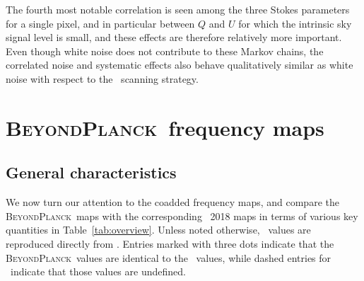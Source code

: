 \documentclass[twocolumn]{aa}
\newcommand{\BP}{\textsc{BeyondPlanck}}
\begin{document}
The fourth most notable correlation is seen among the three Stokes
parameters for a single pixel, and in particular between $Q$ and $U$
for which the intrinsic sky signal level is small, and these effects
are therefore relatively more important. Even though white noise does
not contribute to these Markov chains, the correlated noise and
systematic effects also behave qualitatively similar as white noise
with respect to the \Planck\ scanning strategy. 




\section{\BP\ frequency maps}
\label{sec:freqmaps}

\subsection{General characteristics}
\label{sec:general_char}


We now turn our attention to the coadded frequency maps, and compare
the \BP\ maps with the corresponding \Planck\ 2018 maps in terms of
various key quantities in Table~\ref{tab:overview}. Unless noted
otherwise, \Planck\ values are reproduced directly from
\citet{planck2016-l02}. Entries marked with three dots indicate that
the \BP\ values are identical to the \Planck\ values, while dashed 
entries for \Planck\ indicate that those values are undefined.
\end{document}
